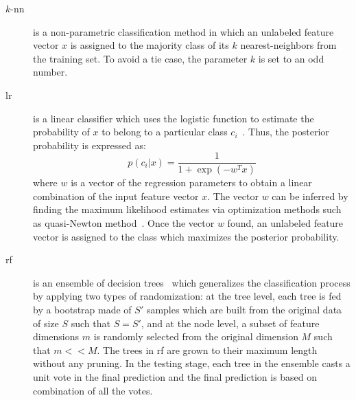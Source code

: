 \begin{description}

\item[$k$-\acf{nn}] is a non-parametric classification method in which an unlabeled feature vector $x$ is assigned to the majority class of its $k$ nearest-neighbors from the training set.
To avoid a tie case, the parameter $k$ is set to an odd number.

\item[\acf{lr}] is a linear classifier which uses the logistic function to estimate the probability of $x$ to belong to a particular class $c_i$~\cite{cox1958regression}.
Thus, the posterior probability is expressed as:
\begin{equation} \label{eq:ppc1lr}
p(c_{i}|x) = \frac{1}{1+\exp(-w^{T}x)}
\end{equation}
\noindent where $w$ is a vector of the regression parameters to obtain a linear combination of the input feature vector $x$.
The vector $w$ can be inferred by finding the maximum likelihood estimates via optimization methods such as quasi-Newton method~\cite{byrd1994representations}.
Once the vector $w$ found, an unlabeled feature vector is assigned to the class which maximizes the posterior probability.

\item[\acf{rf}] is an ensemble of decision trees~\cite{breiman2001random} which generalizes the classification process by applying two types of randomization: at the tree level, each tree is fed by a bootstrap made of $S'$ samples which are built from the original data of size $S$ such that  $S=S'$, and at the node level, a subset of feature dimensions $m$ is randomly selected from the original dimension $M$ such that $m << M$.
The trees in \ac{rf} are grown to their maximum length without any pruning.
In the testing stage, each tree in the ensemble casts a unit vote in the final prediction and the final prediction is based on combination of all the votes.


\end{description}
